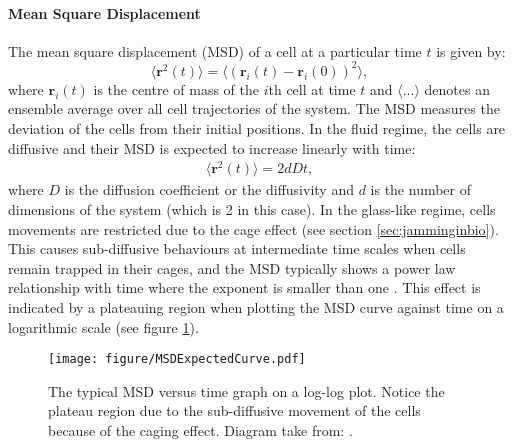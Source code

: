 \documentclass[a4paper,12pt]{article}
\begin{document}
\paragraph{Mean Square Displacement}
The mean square displacement (MSD) of a cell at a particular time $t$ is given by:
\begin{equation}
\langle{\bm{r}^2(t)\rangle} = \langle{\left(\bm{r}_i(t) - \bm{r}_i(0)\right)^2\rangle},
\end{equation}
where $\bm{r}_i (t)$ is the centre of mass of the $i$th cell at time $t$ and $\langle...\rangle$ denotes an ensemble average over all cell trajectories of the system. The MSD measures the deviation of the cells from their initial positions. In the fluid regime, the cells are diffusive and their MSD is expected to increase linearly with time:
\begin{eqnarray}
\langle{\bm{r}^2(t)\rangle} = 2dDt, 
\end{eqnarray}
where $D$ is the diffusion coefficient or the diffusivity and $d$ is the number of dimensions of the system (which is 2 in this case). In the glass-like regime, cells movements are restricted due to the cage effect (see section \ref{sec:jamminginbio}). This causes sub-diffusive behaviours at intermediate time scales when cells remain trapped in their cages, and the MSD typically shows a power law relationship with time where the exponent is smaller than one \cite{hofling2013}. This effect is indicated by a plateauing region when plotting the MSD curve against time on a logarithmic scale (see figure \ref{fig:MSDExpectedCurve}).
\begin{figure}[h]
\centering
\texttt{[image: figure/MSDExpectedCurve.pdf]}
\caption{The typical MSD versus time graph on a log-log plot. Notice the plateau region due to the sub-diffusive movement of the cells because of the caging effect. Diagram take from: \cite{hofling2013}.}
\label{fig:MSDExpectedCurve}
\end{figure}
\end{document}
